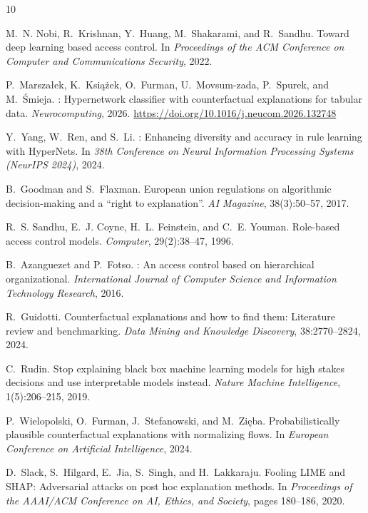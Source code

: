 \documentclass[12pt,a4paper]{article}
\begin{document}
\begin{thebibliography}{10}

M.~N. Nobi, R.~Krishnan, Y.~Huang, M.~Shakarami, and R.~Sandhu.
\newblock Toward deep learning based access control.
\newblock In \textit{Proceedings of the ACM Conference on Computer and Communications Security}, 2022.

P.~Marsza{\l}ek, K.~Ksi{\k{a}}{\.z}ek, O.~Furman, U.~Movsum-zada, P.~Spurek, and M.~{\'S}mieja.
: Hypernetwork classifier with counterfactual explanations for tabular data.
\newblock \textit{Neurocomputing}, 2026.
\newblock \url{https://doi.org/10.1016/j.neucom.2026.132748}

Y.~Yang, W.~Ren, and S.~Li.
: Enhancing diversity and accuracy in rule learning with {HyperNets}.
\newblock In \textit{38th Conference on Neural Information Processing Systems (NeurIPS 2024)}, 2024.

B.~Goodman and S.~Flaxman.
\newblock European union regulations on algorithmic decision-making and a ``right to explanation''.
\newblock \textit{AI Magazine}, 38(3):50--57, 2017.

R.~S. Sandhu, E.~J. Coyne, H.~L. Feinstein, and C.~E. Youman.
\newblock Role-based access control models.
\newblock \textit{Computer}, 29(2):38--47, 1996.

B.~Azanguezet and P.~Fotso.
: An access control based on hierarchical organizational.
\newblock \textit{International Journal of Computer Science and Information Technology Research}, 2016.

R.~Guidotti.
\newblock Counterfactual explanations and how to find them: Literature review and benchmarking.
\newblock \textit{Data Mining and Knowledge Discovery}, 38:2770--2824, 2024.

C.~Rudin.
\newblock Stop explaining black box machine learning models for high stakes decisions and use interpretable models instead.
\newblock \textit{Nature Machine Intelligence}, 1(5):206--215, 2019.

P.~Wielopolski, O.~Furman, J.~Stefanowski, and M.~Zi{\k{e}}ba.
\newblock Probabilistically plausible counterfactual explanations with normalizing flows.
\newblock In \textit{European Conference on Artificial Intelligence}, 2024.

D.~Slack, S.~Hilgard, E.~Jia, S.~Singh, and H.~Lakkaraju.
\newblock Fooling {LIME} and {SHAP}: Adversarial attacks on post hoc explanation methods.
\newblock In \textit{Proceedings of the AAAI/ACM Conference on AI, Ethics, and Society}, pages 180--186, 2020.

\end{thebibliography}
\end{document}
